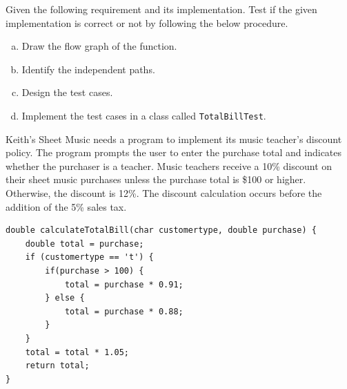 \begin{exercise}
    Given the following requirement and its implementation. Test if the given implementation is correct or not by following the below procedure.
    \begin{enumerate}[a),noitemsep]
        \item Draw the flow graph of the function.
        \item Identify the independent paths.
        \item Design the test cases.
        \item Implement the test cases in a class called \lstinline!TotalBillTest!.
    \end{enumerate}

    Keith’s Sheet Music needs a program to implement its music teacher’s discount policy. The program prompts the user to enter the purchase total and indicates whether the purchaser is a teacher. Music teachers receive a 10\% discount on their sheet music purchases unless the purchase total is \$100 or higher. Otherwise, the discount is 12\%. The discount calculation occurs before the addition of the 5\% sales tax.
    
    \begin{lstlisting}[caption={A proposed solution for the above requirement.}]
double calculateTotalBill(char customertype, double purchase) {
    double total = purchase;
    if (customertype == 't') {
        if(purchase > 100) {
            total = purchase * 0.91;
        } else {
            total = purchase * 0.88;
        }
    }
    total = total * 1.05;
    return total;
}
    \end{lstlisting}
\end{exercise}

